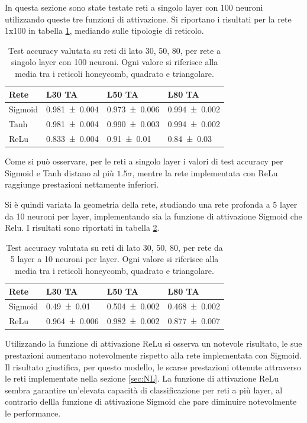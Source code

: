 \documentclass{article}
\begin{document}
In questa sezione sono state testate reti a singolo layer con 100 neuroni utilizzando queste tre funzioni di attivazione.
Si riportano i risultati per la rete 1x100 in tabella \ref{tab:SigVsReluVsTanhS}, mediando sulle tipologie di reticolo.
\begin{table}[!ht]
\begin{center}
\begin{tabular}{llll}
\toprule
Rete & L30 TA & L50 TA & L80 TA \\
\midrule
Sigmoid & \num{0.981\pm 0.004} & \num{0.973\pm 0.006} & \num{0.994\pm 0.002}\\
Tanh & \num{0.981\pm 0.004} & \num{0.990 \pm 0.003} &\num{ 0.994\pm 0.002}\\
ReLu  & \num{0.833\pm 0.004} & \num{0.91 \pm 0.01} &\num{ 0.84\pm 0.03}\\
\bottomrule
\end{tabular}
\end{center}
\caption{Test accuracy valutata su reti di lato 30, 50, 80, per rete a singolo layer con 100 neuroni. Ogni valore si riferisce alla media tra i reticoli honeycomb, quadrato e triangolare.}
\label{tab:SigVsReluVsTanhS}
\end{table}
Come si può osservare, per le reti a singolo layer i valori di test accuracy per Sigmoid e Tanh distano al più $1.5\sigma$, mentre la rete implementata con ReLu raggiunge prestazioni nettamente inferiori.

Si è quindi variata la geometria della rete, studiando una rete profonda a 5 layer da 10 neuroni per layer, implementando sia la funzione di attivazione Sigmoid che Relu.
I risultati sono riportati in tabella \ref{tab:SigVsRelu}.
\begin{table}[!ht]
\begin{center}
\begin{tabular}{llll}
\toprule
Rete & L30 TA & L50 TA & L80 TA \\
\midrule
Sigmoid & \num{0.49\pm 0.01} & \num{0.504\pm 0.002} & \num{0.468\pm 0.002}\\
ReLu  & \num{0.964\pm 0.006} & \num{0.982 \pm 0.002} &\num{ 0.877\pm 0.007}\\
\bottomrule
\end{tabular}
\end{center}
\caption{Test accuracy valutata su reti di lato 30, 50, 80, per rete da 5 layer a 10 neuroni per layer. Ogni valore si riferisce alla media tra i reticoli honeycomb, quadrato e triangolare.}
\label{tab:SigVsRelu}
\end{table}
Utilizzando la funzione di attivazione ReLu si osserva un notevole risultato, le sue prestazioni aumentano notevolmente rispetto alla rete implementata con Sigmoid.
Il risultato giustifica, per questo modello, le scarse prestazioni ottenute attraverso le reti implementate nella sezione \ref{sec:NL}.
La funzione di attivazione ReLu sembra garantire un'elevata  capacità di classificazione per reti a più layer, al contrario dellla funzione di attivazione Sigmoid che pare diminuire notevolmente le performance.
\end{document}
